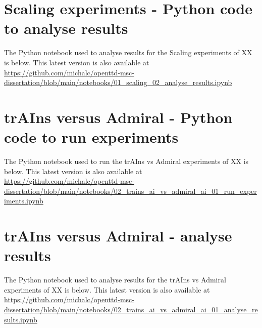 \documentclass[logo,msc,dsti]{infthesis}    %
\begin{document}


\chapter{Scaling experiments - Python code to analyse results}
\label{chapter:scaling-analyis-code}

The Python notebook used to analyse results for the Scaling experiments of XX is below. This latest version is also available at \url{https://github.com/michalc/openttd-msc-dissertation/blob/main/notebooks/01_scaling_02_analyse_results.ipynb}



\chapter{trAIns versus Admiral - Python code to run experiments}
\label{chapter:trains-vs-admiral-run-experiments}

The Python notebook used to run the trAIns vs Admiral experiments of XX is below. This latest version is also available at \url{https://github.com/michalc/openttd-msc-dissertation/blob/main/notebooks/02_trains_ai_vs_admiral_ai_01_run_experiments.ipynb}



\chapter{trAIns versus Admiral - analyse results}

The Python notebook used to analyse results for the trAIns vs Admiral experiments of XX is below. This latest version is also available at \url{https://github.com/michalc/openttd-msc-dissertation/blob/main/notebooks/02_trains_ai_vs_admiral_ai_01_analyse_results.ipynb}


\end{document}
